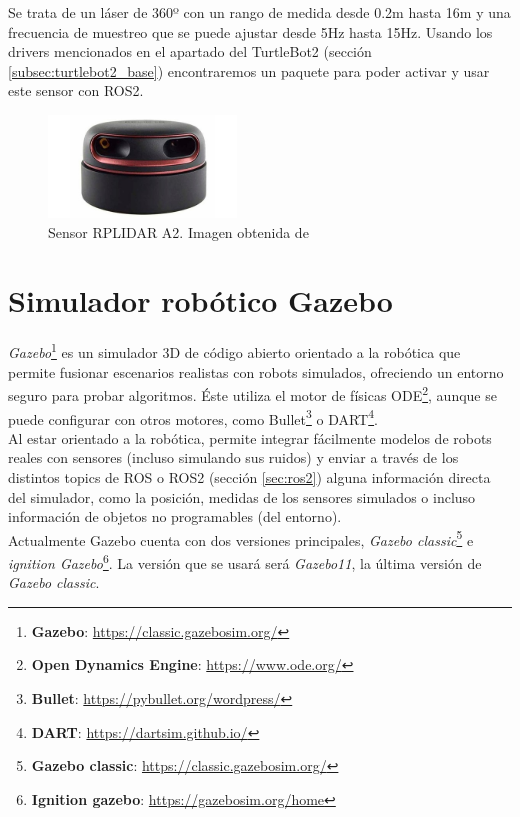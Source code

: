 Se trata de un láser de 360º con un rango de medida desde 0.2m hasta 16m y una frecuencia de muestreo que se puede ajustar desde 5Hz hasta 15Hz.
Usando los drivers mencionados en el apartado del TurtleBot2 (sección \ref{subsec:turtlebot2_base}) encontraremos un paquete para poder activar y usar este sensor con ROS2.\\

\begin{figure} [H]
    \begin{center}
        \includegraphics[width=5cm]{figs/c3/rplidar-a2.jpg}
    \end{center}
    \caption[RPLIDAR A2]{Sensor RPLIDAR A2. Imagen obtenida de \cite{rplidar}}
    \label{fig:rplidar}
\end{figure}

\section{Simulador robótico Gazebo}
\label{sec:gazebo}

\textit{Gazebo}\footnote{\textbf{Gazebo}: \url{https://classic.gazebosim.org/}} es un simulador 3D de código abierto orientado a la robótica que permite
fusionar escenarios realistas con robots simulados, ofreciendo un entorno seguro para probar algoritmos. Éste utiliza el motor de físicas
ODE\footnote{\textbf{Open Dynamics Engine}: \url{https://www.ode.org/}}, aunque se puede configurar con otros motores, como
Bullet\footnote{\textbf{Bullet}: \url{https://pybullet.org/wordpress/}} o DART\footnote{\textbf{DART}: \url{https://dartsim.github.io/}}.\\

Al estar orientado a la robótica, permite integrar fácilmente modelos de robots reales con sensores (incluso simulando sus ruidos) y enviar a través
de los distintos topics de ROS o ROS2 (sección \ref{sec:ros2}) alguna información directa del simulador, como la posición, medidas de los sensores simulados o
incluso información de objetos no programables (del entorno).\\

Actualmente Gazebo cuenta con dos versiones principales, \textit{Gazebo classic}\footnote{\textbf{Gazebo classic}: \url{https://classic.gazebosim.org/}} e
\textit{ignition Gazebo}\footnote{\textbf{Ignition gazebo}: \url{https://gazebosim.org/home}}. La versión que se usará será \textit{Gazebo11}, la última
versión de \textit{Gazebo classic}.

